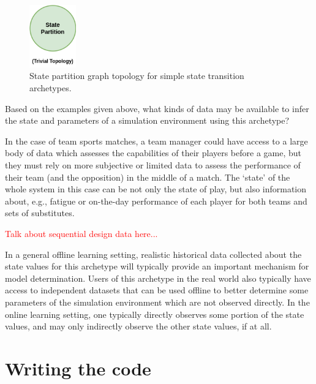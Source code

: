 \begin{figure}[h]
\centering
\includegraphics[width=2cm]{images/chapter-6-state-partition-graph.drawio.png}
\caption{State partition graph topology for simple state transition archetypes.}
\label{fig:state-partition-graph-simple-state-transitions}
\end{figure}

Based on the examples given above, what kinds of data may be available to infer the state and parameters of a simulation environment using this archetype? 

In the case of team sports matches, a team manager could have access to a large body of data which assesses the capabilities of their players before a game, but they must rely on more subjective or limited data to assess the performance of their team (and the opposition) in the middle of a match. The `state' of the whole system in this case can be not only the state of play, but also information about, e.g., fatigue or on-the-day performance of each player for both teams and sets of substitutes. 

\textcolor{red}{Talk about sequential design data here...}

In a general offline learning setting, realistic historical data collected about the state values for this archetype will typically provide an important mechanism for model determination. Users of this archetype in the real world also typically have access to independent datasets that can be used offline to better determine some parameters of the simulation environment which are not observed directly. In the online learning setting, one typically directly observes some portion of the state values, and may only indirectly observe the other state values, if at all.


\section{\sffamily Writing the code}

